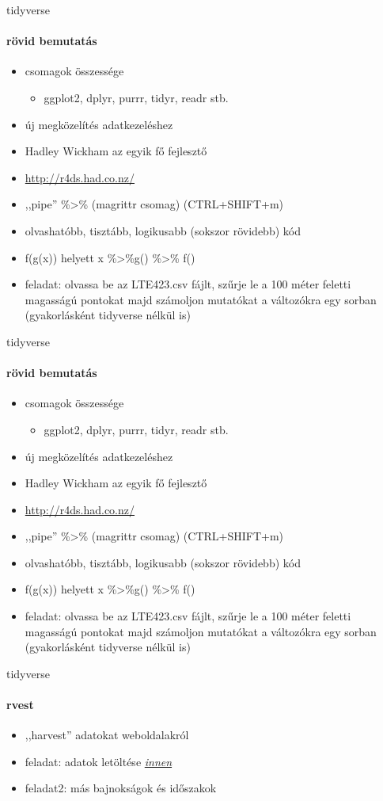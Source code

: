 \documentclass[10pt]{beamer}
\begin{document}
\begin{frame}{tidyverse}
\framesubtitle{rövid bemutatás}
\begin{itemize}
\item csomagok összessége
\begin{itemize}
\item ggplot2, dplyr, purrr, tidyr, readr stb.
\end{itemize}
\item új megközelítés adatkezeléshez
\item Hadley Wickham az egyik fő fejlesztő
\item \url{http://r4ds.had.co.nz/}
\item ,,pipe'' \%>\% (magrittr csomag) (CTRL+SHIFT+m)
\item olvashatóbb, tisztább, logikusabb (sokszor rövidebb) kód
\item f(g(x)) helyett x \%>\%g() \%>\% f()
\item feladat: olvassa be az LTE423.csv fájlt, szűrje le a 100 méter feletti magasságú pontokat majd számoljon mutatókat a változókra egy sorban (gyakorlásként tidyverse nélkül is)
\end{itemize}
\end{frame}

\begin{frame}{tidyverse}
\framesubtitle{rövid bemutatás}
\begin{itemize}
\item csomagok összessége
\begin{itemize}
\item ggplot2, dplyr, purrr, tidyr, readr stb.
\end{itemize}
\item új megközelítés adatkezeléshez
\item Hadley Wickham az egyik fő fejlesztő
\item \url{http://r4ds.had.co.nz/}
\item ,,pipe'' \%>\% (magrittr csomag) (CTRL+SHIFT+m)
\item olvashatóbb, tisztább, logikusabb (sokszor rövidebb) kód
\item f(g(x)) helyett x \%>\%g() \%>\% f()
\item feladat: olvassa be az LTE423.csv fájlt, szűrje le a 100 méter feletti magasságú pontokat majd számoljon mutatókat a változókra egy sorban (gyakorlásként tidyverse nélkül is)
\end{itemize}
\end{frame}

\begin{frame}{tidyverse}
\framesubtitle{rvest}
\begin{itemize}
\item ,,harvest'' adatokat weboldalakról
\item feladat: adatok letöltése \textit{\href{https://www.transfermarkt.com/premier-league/einnahmenausgaben/wettbewerb/GB1/plus/0?ids=a&sa=&saison_id=2012&saison_id_bis=2012&nat=&pos=&altersklasse=&w_s=&leihe=&intern=0}{innen}}
\item feladat2: más bajnokságok és időszakok
\end{itemize}
\end{frame}
\end{document}

